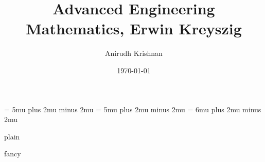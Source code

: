 \documentclass[10pt, oneside]{book}
\author{Anirudh Krishnan}
\title{Advanced Engineering Mathematics, Erwin Kreyszig}
\date{\today}
\numberwithin{equation}{section}
\begin{document}
\renewcommand{\arraystretch}{1.5}
\layout
\begin{titlepage}
    
    \frontmatter
    \tableofcontents
    \listoffigures
    \listoftables
\end{titlepage}

\mainmatter

\setlength{\abovedisplayskip}{2em}
\setlength{\belowdisplayskip}{2em}
\setlength{\abovedisplayshortskip}{2em}
\setlength{\belowdisplayshortskip}{2em}


\thinmuskip = 5mu plus 2mu minus 2mu
\medmuskip = 5mu plus 2mu minus 2mu
\thickmuskip = 6mu plus 2mu minus 2mu


\fancypagestyle
{plain}
{\fancyhf{}
    \fancyhead[]{}
    \renewcommand{\headrulewidth}{0pt}
    \renewcommand{\footrulewidth}{0pt}}

\fancypagestyle
{fancy}{
    \fancyhead[]{}
    \renewcommand{\headrulewidth}{0pt}
    \renewcommand{\footrulewidth}{0pt}}

\pagestyle{fancy}














% 
% 
% 
% 
% 
% 
% 
% 
% 
% 

\end{document}
